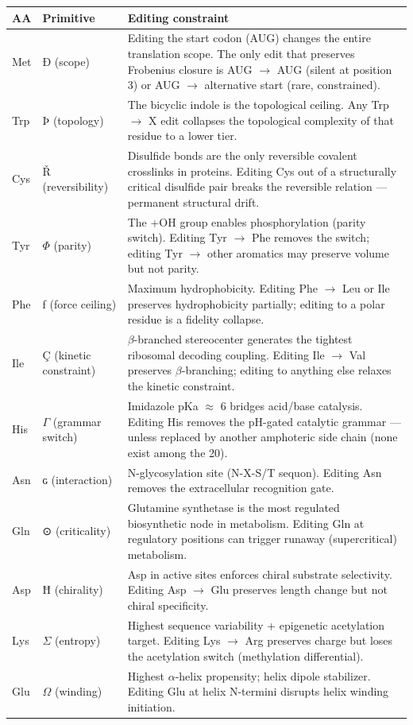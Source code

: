 \documentclass[12pt,a4paper]{article}
\begin{document}
\begin{table}[htbp]
\centering
\small
{}
\begin{tabularx}{\textwidth}{>{\centering\arraybackslash}X >{\centering\arraybackslash}X >{\centering\arraybackslash}X}
\toprule
\rowcolor{gray!25}\textbf{AA} & \textbf{Primitive} & \textbf{Editing constraint} \\
\midrule
\rowcolors{1}{white}{gray!10}
Met & Ð (scope) & Editing the start codon (AUG) changes the entire translation scope. The only edit that preserves Frobenius closure is AUG $\rightarrow$ AUG (silent at position 3) or AUG $\rightarrow$ alternative start (rare, constrained). \\
Trp & Þ (topology) & The bicyclic indole is the topological ceiling. Any Trp $\rightarrow$ X edit collapses the topological complexity of that residue to a lower tier. \\
Cys & Ř (reversibility) & Disulfide bonds are the only reversible covalent crosslinks in proteins. Editing Cys out of a structurally critical disulfide pair breaks the reversible relation --- permanent structural drift. \\
Tyr & $\Phi$ (parity) & The +OH group enables phosphorylation (parity switch). Editing Tyr $\rightarrow$ Phe removes the switch; editing Tyr $\rightarrow$ other aromatics may preserve volume but not parity. \\
Phe & ƒ (force ceiling) & Maximum hydrophobicity. Editing Phe $\rightarrow$ Leu or Ile preserves hydrophobicity partially; editing to a polar residue is a fidelity collapse. \\
Ile & Ç (kinetic constraint) & $\beta$-branched stereocenter generates the tightest ribosomal decoding coupling. Editing Ile $\rightarrow$ Val preserves $\beta$-branching; editing to anything else relaxes the kinetic constraint. \\
His & $\Gamma$ (grammar switch) & Imidazole pKa $\approx$ 6 bridges acid/base catalysis. Editing His removes the pH-gated catalytic grammar --- unless replaced by another amphoteric side chain (none exist among the 20). \\
Asn & ɢ (interaction) & N-glycosylation site (N-X-S/T sequon). Editing Asn removes the extracellular recognition gate. \\
Gln & ⊙ (criticality) & Glutamine synthetase is the most regulated biosynthetic node in metabolism. Editing Gln at regulatory positions can trigger runaway (supercritical) metabolism. \\
Asp & Ħ (chirality) & Asp in active sites enforces chiral substrate selectivity. Editing Asp $\rightarrow$ Glu preserves length change but not chiral specificity. \\
Lys & $\Sigma$ (entropy) & Highest sequence variability + epigenetic acetylation target. Editing Lys $\rightarrow$ Arg preserves charge but loses the acetylation switch (methylation differential). \\
Glu & $\Omega$ (winding) & Highest $\alpha$-helix propensity; helix dipole stabilizer. Editing Glu at helix N-termini disrupts helix winding initiation. \\
\bottomrule
\end{tabularx}
\end{table}
\end{document}
